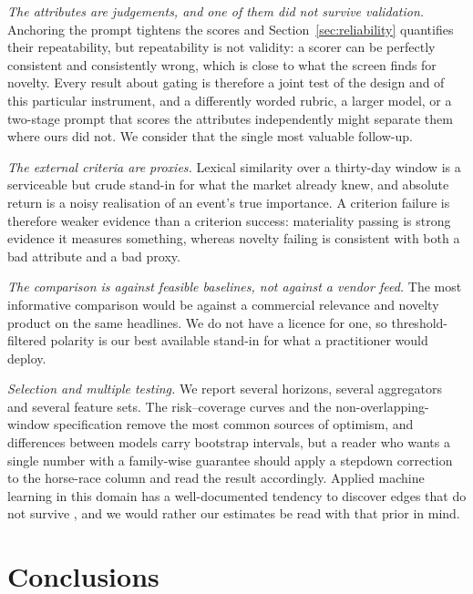 \documentclass[preprint,12pt,authoryear]{elsarticle}
\theoremstyle{plain}
\theoremstyle{remark}
\begin{document}
\emph{The attributes are judgements, and one of them did not survive
validation.} Anchoring the prompt tightens the scores and
Section~\ref{sec:reliability} quantifies their repeatability, but repeatability
is not validity: a scorer can be perfectly consistent and consistently wrong,
which is close to what the screen finds for novelty. Every result about gating is
therefore a joint test of the design and of this particular instrument, and a
differently worded rubric, a larger model, or a two-stage prompt that scores the
attributes independently might separate them where ours did not. We consider that
the single most valuable follow-up.

\emph{The external criteria are proxies.} Lexical similarity over a thirty-day
window is a serviceable but crude stand-in for what the market already knew, and
absolute return is a noisy realisation of an event's true importance. A criterion
failure is therefore weaker evidence than a criterion success: materiality
passing is strong evidence it measures something, whereas novelty failing is
consistent with both a bad attribute and a bad proxy.

\emph{The comparison is against feasible baselines, not against a vendor feed.}
The most informative comparison would be against a commercial relevance and
novelty product on the same headlines. We do not have a licence for one, so
threshold-filtered polarity is our best available stand-in for what a
practitioner would deploy.

\emph{Selection and multiple testing.} We report several horizons, several
aggregators and several feature sets. The risk--coverage curves and the
non-overlapping-window specification remove the most common sources of optimism,
and differences between models carry bootstrap intervals, but a reader who wants
a single number with a family-wise guarantee should apply a stepdown correction
\citep{romano2005} to the horse-race column and read the result accordingly.
Applied machine learning in this domain has a well-documented tendency to
discover edges that do not survive \citep{bailey2017,harvey2016}, and we would
rather our estimates be read with that prior in mind.

\section{Conclusions}\label{sec:conclusion}
\end{document}
